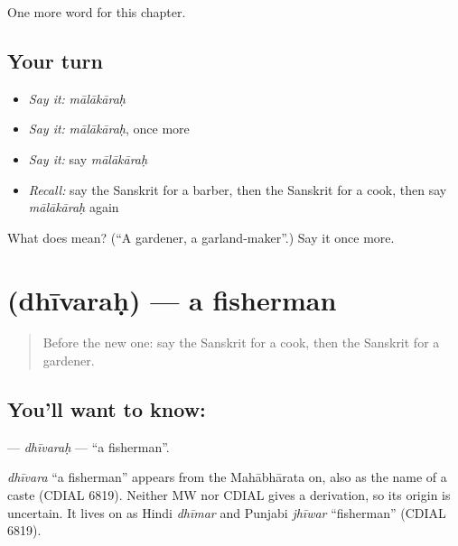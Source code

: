 \begin{grammarlens}[title={What you've built}]
One more word for this chapter.
\end{grammarlens}

\subsection*{Your turn}
\begin{itemize}
\raggedright
  \item \emph{Say it:} \emph{mālākāraḥ}
  \item \emph{Say it:} \emph{mālākāraḥ}, once more
  \item \emph{Say it:} say \emph{mālākāraḥ}
  \item \emph{Recall:} say the Sanskrit for a barber, then the Sanskrit for a cook, then say \emph{mālākāraḥ} again
\end{itemize}

\begin{tcolorbox}[breakable,colback=teal!4,colframe=teal!35!black,title={Before you move on}]
What does  mean? (\textquotedblleft{}A gardener, a garland-maker\textquotedblright{}.) Say it once more.
\end{tcolorbox}
\section[\texorpdfstring{\sk{धीवरः} (dhīvaraḥ)}{धीवरः (dhīvaraḥ)}]{ (dhīvaraḥ) — a fisherman}

\label{lesson:SA-C148-dhivarah}



\begin{quote}
Before the new one: say the Sanskrit for a cook, then the Sanskrit for a gardener.
\end{quote}

\subsection*{You'll want to know: }
\textbf{} — \emph{dhīvaraḥ} — \textquotedblleft{}a fisherman\textquotedblright{}.

\begin{cousinweb}
\emph{dhīvara} \textquotedblleft{}a fisherman\textquotedblright{} appears from the Mahābhārata on, also as the name of a caste (CDIAL 6819). Neither MW nor CDIAL gives a derivation, so its origin is uncertain. It lives on as Hindi \emph{dhīmar} and Punjabi \emph{jhīwar} \textquotedblleft{}fisherman\textquotedblright{} (CDIAL 6819).
\end{cousinweb}

